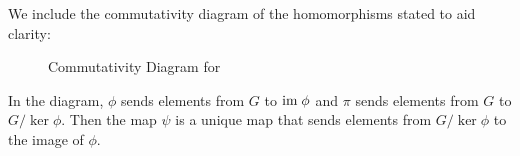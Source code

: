\newpage

We include the commutativity diagram of the homomorphisms stated to aid clarity:

\begin{figure}[h]
    \centering
    \caption{Commutativity Diagram for }
\end{figure}

In the diagram, $\phi$ sends elements from $G$ to $\mathrm{im}\;\phi$ and $\pi$ sends elements from $G$ to $G/\ker\phi$. Then the map $\psi$ is a unique map that sends elements from $G/\ker\phi$ to the image of $\phi$.

